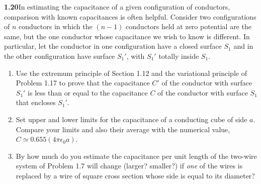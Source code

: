 \par\bigskip
\noindent\textbf{1.20}\quad In estimating the capacitance of a given configuration of conductors, comparison with known capacitances is often helpful. Consider two configurations of $n$ conductors in which the $(n-1)$ conductors held at zero potential are the same, but the one conductor whose capacitance we wish to know is different. In particular, let the conductor in one configuration have a closed surface $S_{1}$ and in the other configuration have surface $S_{1}'$, with $S_{1}'$ totally inside $S_{1}$.
\begin{enumerate}
\item[(a)] Use the extremum principle of Section 1.12 and the variational principle of Problem 1.17 to prove that the capacitance $C'$ of the conductor with surface $S_{1}'$ is less than or equal to the capacitance $C$ of the conductor with surface $S_{1}$ that encloses $S_{1}'$.
\item[(b)] Set upper and lower limits for the capacitance of a conducting cube of side $a$. Compare your limits and also their average with the numerical value, $C\simeq0.655(4\pi\epsilon_{0}a)$.
\item[(c)] By how much do you estimate the capacitance per unit length of the two-wire system of Problem 1.7 will change (larger? smaller?) if \emph{one} of the wires is replaced by a wire of square cross section whose side is equal to its diameter?
\end{enumerate}
\solution
